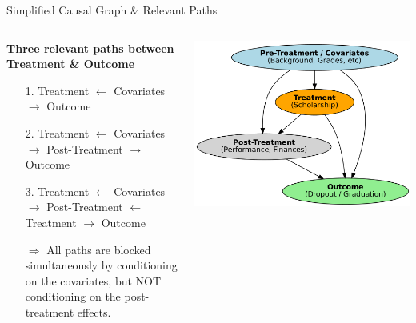 \documentclass[aspectratio=169]{beamer}
\begin{document}
\begin{frame}{Simplified Causal Graph \& Relevant Paths}
	 \begin{columns}
	\begin{column}{0.58\textwidth}

\textbf{Three relevant paths between \\ Treatment \& Outcome}

\begin{itemize}
    \item [1.] Treatment $\leftarrow$ Covariates $\rightarrow$ Outcome
    \item [2.] Treatment $\leftarrow$ Covariates $\rightarrow$ Post-Treatment $\rightarrow$ Outcome
    \item [3.] Treatment $\leftarrow$ Covariates $\rightarrow$ Post-Treatment $\leftarrow$ Treatment $\rightarrow$ Outcome
\end{itemize}
\begin{itemize}
	\item [$\Rightarrow$] All paths are blocked simultaneously by conditioning on the covariates, but NOT conditioning on the post-treatment effects.
\end{itemize}
  \end{column}

	\begin{column}{0.45\textwidth}
	\hspace*{-0.5cm}
    \includegraphics[width=1.1\textwidth]{Tex_Pictures/DAG_simple.png}

	\end{column}

\end{columns}
\end{frame}
\end{document}

